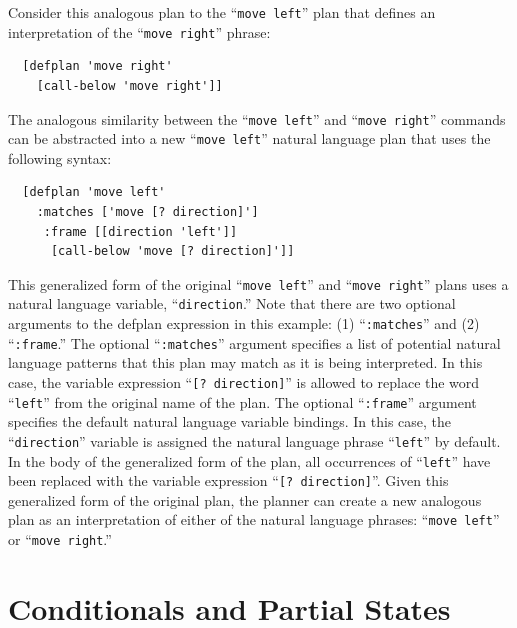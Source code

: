 Consider this analogous plan to the ``{\tt{move left}}'' plan that
defines an interpretation of the ``{\tt{move right}}'' phrase:
\begin{samepage}
\begin{Verbatim}
  [defplan 'move right'
    [call-below 'move right']]
\end{Verbatim}
\end{samepage}
The analogous similarity between the ``{\tt{move left}}'' and
``{\tt{move right}}'' commands can be abstracted into a new
``{\tt{move left}}'' natural language plan that uses the following
syntax:
\begin{samepage}
\begin{Verbatim}
  [defplan 'move left'
    :matches ['move [? direction]']
     :frame [[direction 'left']]
      [call-below 'move [? direction]']]
\end{Verbatim}
\end{samepage}
This generalized form of the original ``{\tt{move left}}'' and
``{\tt{move right}}'' plans uses a natural language variable,
``{\tt{direction}}.''  Note that there are two optional arguments to
the defplan expression in this example: (1) ``{\tt{:matches}}'' and
(2) ``{\tt{:frame}}.''  The optional ``{\tt{:matches}}'' argument
specifies a list of potential natural language patterns that this plan
may match as it is being interpreted.  In this case, the variable
expression ``{\tt{[?  direction]}}'' is allowed to replace the word
``{\tt{left}}'' from the original name of the plan.  The optional
``{\tt{:frame}}'' argument specifies the default natural language
variable bindings.  In this case, the ``{\tt{direction}}'' variable is
assigned the natural language phrase ``{\tt{left}}'' by default.  In
the body of the generalized form of the plan, all occurrences of
``{\tt{left}}'' have been replaced with the variable expression
``{\tt{[?  direction]}}''.  Given this generalized form of the
original plan, the planner can create a new analogous plan as an
interpretation of either of the natural language phrases: ``{\tt{move
    left}}'' or ``{\tt{move right}}.''

\section{Conditionals and Partial States}

